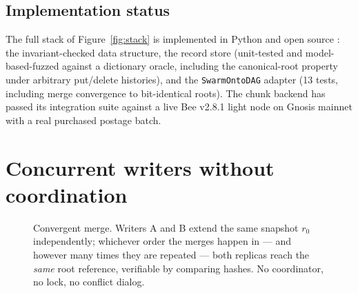 \documentclass[10pt,twocolumn]{article}
\begin{document}
\subsection{Implementation status}
The full stack of Figure~\ref{fig:stack} is implemented in Python and open
source \cite{ontodag}: the invariant-checked data structure, the record
store (unit-tested and model-based-fuzzed against a dictionary oracle,
including the canonical-root property under arbitrary put/delete
histories), and the \texttt{SwarmOntoDAG} adapter (13 tests, including
merge convergence to bit-identical roots). The chunk backend has passed
its integration suite against a live Bee v2.8.1 light node on Gnosis
mainnet with a real purchased postage batch.

\section{Concurrent writers without coordination}
\label{sec:crdt}

\begin{figure}[t]
\centering
{}
\caption{Convergent merge. Writers A and B extend the same snapshot $r_0$
independently; whichever order the merges happen in --- and however many
times they are repeated --- both replicas reach the \emph{same} root
reference, verifiable by comparing hashes. No coordinator, no lock, no
conflict dialog.}
\label{fig:merge}
\end{figure}
\end{document}
